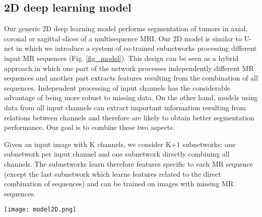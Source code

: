 \documentclass[preprint,12pt]{elsarticle}
\begin{document}
\subsection{2D deep learning model}
\label{model_2D}
Our generic 2D deep learning model performs segmentation of tumors in axial, coronal or sagittal slices of a multisequence MRI. Our 2D model is similar to U-net \cite{ronneberger2015u} in which we introduce a system of co-trained subnetworks processing different input MR sequences (Fig. \ref{fig_model}). This design can be seen as a hybrid approach in which one part of the network processes independently different MR sequences and another part extracts features resulting from the combination of all sequences. Independent processing of input channels has the considerable advantage of being more robust to missing data. On the other hand, models using data from all input channels can extract important information resulting from relations between channels and therefore are likely to obtain better segmentation performance. Our goal is to combine these two aspects.



Given an input image with K channels, we consider K+1 subnetworks: one subnetwork per input channel and one subnetwork directly combining all channels. The subnetworks learn therefore features specific to each MR sequence (except the last subnetwork which learns features related to the direct combination of sequences) and can be trained on images with missing MR sequences. 

\begin{figure*}[h!]
\centering
\texttt{[image: model2D.png]}
\caption{Architecture of the main 2D model used in our experiments (named '2D model 1' in the remainder). The numbers of feature maps are specified below rectangles representing layers. In each subnetwork the first layer is concatenated to an upsampling layer in order to combine local and global information. Each subnetwork learns features specific to one image modality, except one subnetwork which directly combines all modalities. The classification layers of subnetworks are ignored during the test phase. For clarity purposes, we display the case with two MR sequences.}
\label{fig_model}
\end{figure*}
\end{document}
